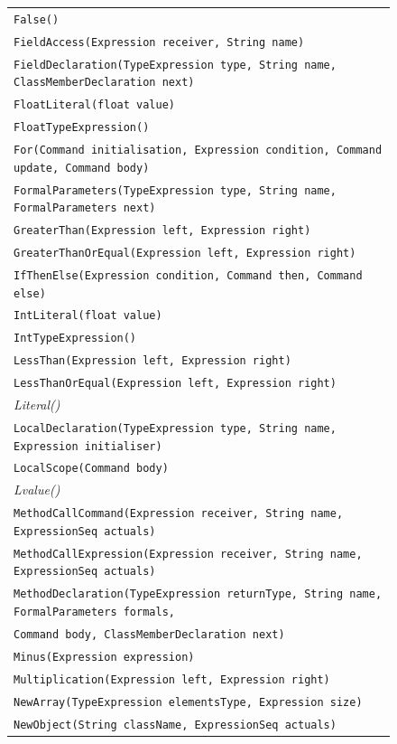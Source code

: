 \begin{figure}
\begin{center}
{\begin{tabular}{l}
\texttt{False()} \\
\texttt{FieldAccess(Expression receiver, String name)} \\
\texttt{FieldDeclaration(TypeExpression type, String name, ClassMemberDeclaration next)} \\
\texttt{FloatLiteral(float value)} \\
\texttt{FloatTypeExpression()} \\
\texttt{For(Command initialisation, Expression condition, Command update, Command body)} \\
\texttt{FormalParameters(TypeExpression type, String name, FormalParameters next)} \\
\texttt{GreaterThan(Expression left, Expression right)} \\
\texttt{GreaterThanOrEqual(Expression left, Expression right)} \\
\texttt{IfThenElse(Expression condition, Command then, Command else)} \\
\texttt{IntLiteral(float value)} \\
\texttt{IntTypeExpression()} \\
\texttt{LessThan(Expression left, Expression right)} \\
\texttt{LessThanOrEqual(Expression left, Expression right)} \\
\textit{Literal()} \\
\texttt{LocalDeclaration(TypeExpression type, String name, Expression initialiser)} \\
\texttt{LocalScope(Command body)} \\
\textit{Lvalue()} \\
\texttt{MethodCallCommand(Expression receiver, String name, ExpressionSeq actuals)} \\
\texttt{MethodCallExpression(Expression receiver, String name, ExpressionSeq actuals)} \\
\texttt{MethodDeclaration(TypeExpression returnType, String name, FormalParameters formals,}\\
\hspace*{21ex}\texttt{Command body, ClassMemberDeclaration next)} \\
\texttt{Minus(Expression expression)} \\
\texttt{Multiplication(Expression left, Expression right)} \\
\texttt{NewArray(TypeExpression elementsType, Expression size)} \\
\texttt{NewObject(String className, ExpressionSeq actuals)} \\

\end{tabular}}
\end{center}
\end{figure}
